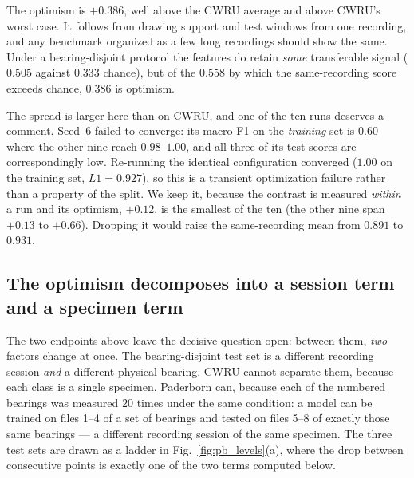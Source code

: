 \documentclass[journal]{IEEEtran}
\begin{document}
The optimism is $+0.386$, well above the CWRU average and above CWRU's worst
case. It follows from drawing support and test windows from one
recording, and any benchmark organized as a few long recordings should show the
same. Under a bearing-disjoint protocol the features do retain
\emph{some} transferable signal ($0.505$ against $0.333$ chance), but of the
$0.558$ by which the same-recording score exceeds chance, $0.386$ is optimism.

The spread is larger here than on CWRU, and one of the ten runs deserves a
comment. Seed~6 failed to converge: its macro-F1 on the \emph{training} set is
$0.60$ where the other nine reach $0.98$--$1.00$, and all three of its test
scores are correspondingly low. Re-running the identical configuration
converged ($1.00$ on the training set, $L1 = 0.927$), so this is a transient
optimization failure rather than a property of the split. We keep it, because
the contrast is measured \emph{within} a run and its optimism, $+0.12$, is the
smallest of the ten (the other nine span $+0.13$ to $+0.66$). Dropping it would
raise the same-recording mean from $0.891$ to $0.931$.

\subsection{The optimism decomposes into a session term and a specimen term}

The two endpoints above leave the decisive question open: between them,
\emph{two} factors change at once. The bearing-disjoint test set is a different recording session \emph{and}
a different physical bearing. CWRU cannot separate them, because each class is a
single specimen. Paderborn can, because each of the numbered bearings was
measured $20$ times under the same condition: a model can be trained on files 1--4 of a
set of bearings and tested on files 5--8 of exactly those same bearings --- a
different recording session of the same specimen. The three test sets are drawn
as a ladder in Fig.~\ref{fig:pb_levels}(a), where the drop between consecutive
points is exactly one of the two terms computed below.
\end{document}
